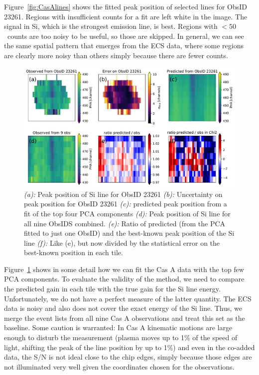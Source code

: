 \documentclass[]{spie}  %
\begin{document}
Figure~\ref{fig:CasAlines} shows the fitted peak position of selected lines for ObsID 23261. Regions with insufficient counts for a fit are left white in the image. The signal in Si, which is the strongest emission line, is best. Regions with $<50$~counts are too noisy to be useful, so those are skipped.
In general, we can see the same spatial pattern that emerges from the ECS data, where some regions are clearly more noisy than others simply because there are fewer counts.

\begin{figure} [ht]
  \begin{center}
    \includegraphics[width=\textwidth]{figures/Si_23261.pdf}
  \end{center}
  \caption
      {\emph{(a):} Peak position of Si line for ObsID 23261 \emph{(b):} Uncertainty on peak position for ObsID 23261 \emph{(c):} predicted peak position from a fit of the top four PCA components \emph{(d):} Peak position of Si line for all nine ObsIDS combined. \emph{(e):} Ratio of predicted (from the PCA fitted to just one ObsID) and the best-known peak position of the Si line \emph{(f):} Like (e), but now divided by the statistical error on the best-known position in each tile.        \label{fig:Si23261}}
\end{figure}

Figure~\ref{fig:Si23261} shows in some detail how we can fit the Cas A data with the top few PCA components. To evaluate the validity of the method, we need to compare the predicted gain in each tile with the true gain for the Si line energy. Unfortunately, we do not have a perfect measure of the latter quantity. The ECS data is noisy and also does not cover the exact energy of the Si line. Thus, we merge the event lists from all nine Cas A observations and treat this set as the baseline. Some caution is warranted: In Cas A kinematic motions are large enough to disturb the measurement (plasma moves up to 1\% of the speed of light, shifting the peak of the line position by up to 1\%) and even in the co-added data, the S/N is not ideal close to the chip edges, simply because those edges are not illuminated very well given the coordinates chosen for the observations.
\end{document}
